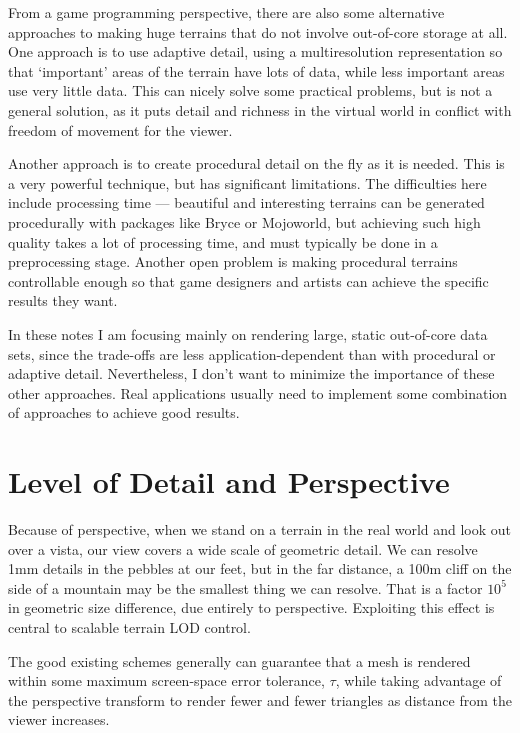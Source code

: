 \documentclass[12pt]{article}
\begin{document}
From a game programming perspective, there are also some alternative
approaches to making huge terrains that do not involve out-of-core
storage at all.  One approach is to use adaptive detail, using a
multiresolution representation so that `important' areas of the
terrain have lots of data, while less important areas use very little
data.  This can nicely solve some practical problems, but is not a
general solution, as it puts detail and richness in the virtual world
in conflict with freedom of movement for the viewer.

Another approach is to create procedural detail on the fly as it is
needed.  This is a very powerful technique, but has significant
limitations.  The difficulties here include processing time ---
beautiful and interesting terrains can be generated procedurally with
packages like Bryce or Mojoworld, but achieving such high quality
takes a lot of processing time, and must typically be done in a
preprocessing stage.  Another open problem is making procedural
terrains controllable enough so that game designers and artists can
achieve the specific results they want.


 
In these notes I am focusing mainly on rendering large, static
out-of-core data sets, since the trade-offs are less
application-dependent than with procedural or adaptive detail.
Nevertheless, I don't want to minimize the importance of these other
approaches.  Real applications usually need to implement some
combination of approaches to achieve good results.
 
\section{Level of Detail and Perspective}

Because of perspective, when we stand on a terrain in the real world
and look out over a vista, our view covers a wide scale of geometric
detail.  We can resolve 1mm details in the pebbles at our feet, but in
the far distance, a 100m cliff on the side of a mountain may be the
smallest thing we can resolve.  That is a factor $10^5$ in geometric
size difference, due entirely to perspective.  Exploiting this effect
is central to scalable terrain LOD control.
 
The good existing schemes generally can guarantee that a mesh is
rendered within some maximum screen-space error tolerance,
$\tau$, while taking advantage of the perspective transform
to render fewer and fewer triangles as distance from the viewer
increases.
 
\end{document}
